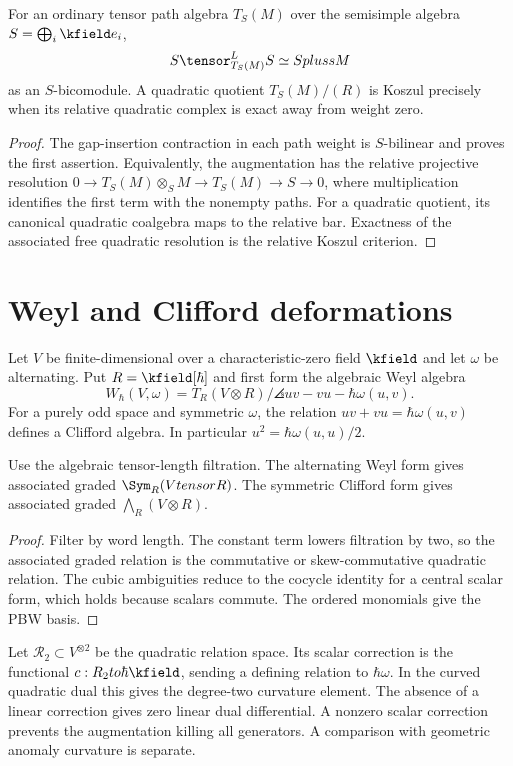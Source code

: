 \begin{theorem}
For an ordinary tensor path algebra $T_S(M)$ over the semisimple algebra $S=\bigoplus_i\kfield e_i$,
\[
 S\tensor_{T_S(M)}^{\mathbb L}S\simeq S\oplus sM
\]
as an $S$-bicomodule. A quadratic quotient $T_S(M)/(R)$ is Koszul precisely when its relative quadratic complex is exact away from weight zero.
\end{theorem}
\begin{proof}
The gap-insertion contraction in each path weight is $S$-bilinear and proves the first assertion.
Equivalently, the augmentation has the relative projective resolution
$0\to T_S(M)\otimes_S M\to T_S(M)\to S\to0$, where multiplication identifies the first term with the nonempty paths.
For a quadratic quotient, its canonical quadratic coalgebra maps to the relative bar. Exactness of the associated free quadratic resolution is the relative Koszul criterion.
\end{proof}

\chapter{Weyl and Clifford deformations}
Let $V$ be finite-dimensional over a characteristic-zero field $\kfield$ and let $\omega$ be alternating.
Put $R=\kfield[\hbar]$ and first form the algebraic Weyl algebra
\[
 W_\hbar(V,\omega)=T_R(V\otimes R)/
 \angles{uv-vu-\hbar\omega(u,v)}.
\]
For a purely odd space and symmetric $\omega$, the relation $uv+vu=\hbar\omega(u,v)$ defines a Clifford algebra. In particular $u^2=\hbar\omega(u,u)/2$.

\begin{theorem}
Use the algebraic tensor-length filtration.
The alternating Weyl form gives associated graded $\Sym_R(V\otimes R)$.
The symmetric Clifford form gives associated graded $\bigwedge_R(V\otimes R)$.
\end{theorem}
\begin{proof}
Filter by word length. The constant term lowers filtration by two, so the associated graded relation is the commutative or skew-commutative quadratic relation. The cubic ambiguities reduce to the cocycle identity for a central scalar form, which holds because scalars commute. The ordered monomials give the PBW basis.
\end{proof}

Let $\mathcal R_2\subset V^{\otimes2}$ be the quadratic relation space.
Its scalar correction is the functional $c:\mathcal R_2\to\hbar\kfield$, sending a defining relation to $\hbar\omega$.
In the curved quadratic dual this gives the degree-two curvature element. The absence of a linear correction gives zero linear dual differential.
A nonzero scalar correction prevents the augmentation killing all generators.
A comparison with geometric anomaly curvature is separate.

